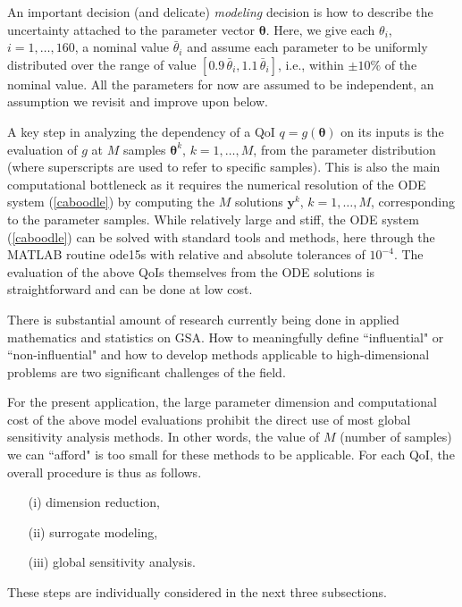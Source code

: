 An important decision (and delicate) {\sl modeling} decision  is how to describe the uncertainty attached to the parameter vector $\boldsymbol{\theta}$. Here, we give each $\theta_i$, $i=1,\dots, 160$, a nominal value $\bar \theta_i$ and assume each parameter to be uniformly distributed over the range of value $[0.9\, \bar\theta_i, 1.1 \,\bar\theta_i]$, i.e., within $\pm 10\%$ of the nominal value. All the parameters for now are assumed to be independent, an assumption we revisit and improve upon below. 

A key  step in analyzing the dependency of a QoI $q = g(\boldsymbol{\theta})$ on its inputs is the evaluation of $g$ at $M$ samples $\boldsymbol\theta^k$, $k=1,\dots, M$, from the parameter distribution (where superscripts are used to refer to specific samples). 
This is also the  main  computational bottleneck as it requires the numerical resolution of  the ODE system (\ref{caboodle})  by computing the $M$ solutions $\mathbf y^k$, $k=1,\dots , M$, corresponding to  the parameter samples. 
While relatively large and stiff, the ODE system (\ref{caboodle}) can be  solved with standard tools and methods, here through the MATLAB routine ode15s  with relative and absolute tolerances of $10^{-4}$. The evaluation of the above QoIs themselves from the ODE solutions is straightforward and can be done at low cost.

There is substantial amount of research currently being done in applied mathematics and statistics on GSA. How to meaningfully define ``influential" or ``non-influential" and  how to develop methods applicable to high-dimensional problems are two significant challenges of the field. 



For the present application, the large parameter dimension and computational cost of the above model evaluations prohibit the direct use of most global sensitivity analysis methods. In other words, the value of $M$ (number of samples)  we can ``afford" is too small for these methods to be applicable. 
For each QoI, the overall procedure is thus as follows. 

\begin{enumerate}
\item[(i)] dimension reduction,
\item[(ii)] surrogate modeling,
\item[(iii)] global sensitivity analysis.
\end{enumerate}

These steps are individually considered in the next three subsections. 




